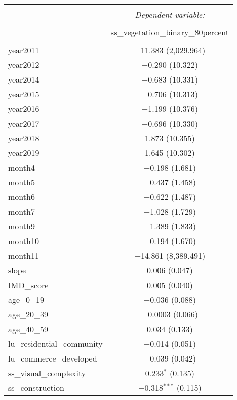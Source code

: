 \begin{table}[!htbp] \centering 
  \caption{} 
  \label{} 
\small 
\begin{tabular}{@{\extracolsep{1pt}}lc} 
\\[-1.8ex]\hline 
\hline \\[-1.8ex] 
 & \multicolumn{1}{c}{\textit{Dependent variable:}} \\ 
\cline{2-2} 
\\[-1.8ex] & ss\_vegetation\_binary\_80percent \\ 
\hline \\[-1.8ex] 
 year2011 & $-$11.383 (2,029.964) \\ 
  year2012 & $-$0.290 (10.322) \\ 
  year2014 & $-$0.683 (10.331) \\ 
  year2015 & $-$0.706 (10.313) \\ 
  year2016 & $-$1.199 (10.376) \\ 
  year2017 & $-$0.696 (10.330) \\ 
  year2018 & 1.873 (10.355) \\ 
  year2019 & 1.645 (10.302) \\ 
  month4 & $-$0.198 (1.681) \\ 
  month5 & $-$0.437 (1.458) \\ 
  month6 & $-$0.622 (1.487) \\ 
  month7 & $-$1.028 (1.729) \\ 
  month9 & $-$1.389 (1.833) \\ 
  month10 & $-$0.194 (1.670) \\ 
  month11 & $-$14.861 (8,389.491) \\ 
  slope & 0.006 (0.047) \\ 
  IMD\_score & 0.005 (0.040) \\ 
  age\_0\_19 & $-$0.036 (0.088) \\ 
  age\_20\_39 & $-$0.0003 (0.066) \\ 
  age\_40\_59 & 0.034 (0.133) \\ 
  lu\_residential\_community & $-$0.014 (0.051) \\ 
  lu\_commerce\_developed & $-$0.039 (0.042) \\ 
  ss\_visual\_complexity & 0.233$^{*}$ (0.135) \\ 
  ss\_construction & $-$0.318$^{***}$ (0.115) \\ 

\end{tabular}
\end{table}
